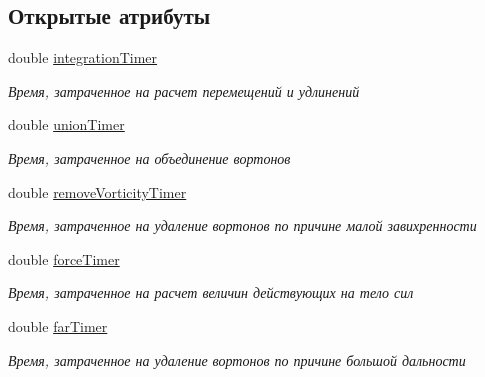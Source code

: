 \subsection*{Открытые атрибуты}
\begin{DoxyCompactItemize}
\item 
\mbox{\label{struct_timers_affd258e9976a6f79f70beaca10811e2a}} 
double \mbox{\hyperlink{struct_timers_affd258e9976a6f79f70beaca10811e2a}{integration\+Timer}}
\begin{DoxyCompactList}\small\item\em Время, затраченное на расчет перемещений и удлинений \end{DoxyCompactList}\item 
\mbox{\label{struct_timers_a12e4298f8f6516bb1d87bcdf00e8a53a}} 
double \mbox{\hyperlink{struct_timers_a12e4298f8f6516bb1d87bcdf00e8a53a}{union\+Timer}}
\begin{DoxyCompactList}\small\item\em Время, затраченное на объединение вортонов \end{DoxyCompactList}\item 
\mbox{\label{struct_timers_a3f9d970ccfbeec3fb0cc9d58e9a274bf}} 
double \mbox{\hyperlink{struct_timers_a3f9d970ccfbeec3fb0cc9d58e9a274bf}{remove\+Vorticity\+Timer}}
\begin{DoxyCompactList}\small\item\em Время, затраченное на удаление вортонов по причине малой завихренности \end{DoxyCompactList}\item 
\mbox{\label{struct_timers_ad7b79d88bce6e9f7964db7528bd58f46}} 
double \mbox{\hyperlink{struct_timers_ad7b79d88bce6e9f7964db7528bd58f46}{force\+Timer}}
\begin{DoxyCompactList}\small\item\em Время, затраченное на расчет величин действующих на тело сил \end{DoxyCompactList}\item 
\mbox{\label{struct_timers_ab2f42ccccc54fade82616e38d849cb3e}} 
double \mbox{\hyperlink{struct_timers_ab2f42ccccc54fade82616e38d849cb3e}{far\+Timer}}
\begin{DoxyCompactList}\small\item\em Время, затраченное на удаление вортонов по причине большой дальности \end{DoxyCompactList}\item 

\end{DoxyCompactItemize}
